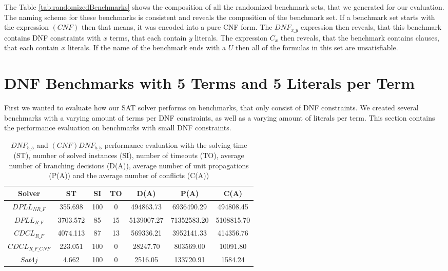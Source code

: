 The Table \ref{tab:randomizedBenchmarks} shows the composition of all the randomized benchmark sets, that we generated for our evaluation. The naming scheme for these benchmarks is consistent and reveals the composition of the benchmark set. If a benchmark set starts with the expression $(CNF)$ then that means, it was encoded into a pure CNF form. The $DNF_{x\_y}$ expression then reveals, that this benchmark contains DNF constraints with $x$ terms, that each contain $y$ literals. The expression $C_x$ then reveals, that the benchmark contains clauses, that each contain $x$ literals. If the name of the benchmark ends with a $U$ then all of the formulas in this set are unsatisfiable.

\section{DNF Benchmarks with 5 Terms and 5 Literals per Term}

First we wanted to evaluate how our SAT solver performs on benchmarks, that only consist of DNF constraints. We created several benchmarks with a varying amount of terms per DNF constraints, as well as a varying amount of literals per term. This section contains the performance evaluation on benchmarks with small DNF constraints.

\begin{table}[!htb]
\centering
\caption[$DNF_{5\_5}$ and $(CNF)DNF_{5\_5}$ performance evaluation]{$DNF_{5\_5}$ and $(CNF)DNF_{5\_5}$ performance evaluation with the solving time (ST), number of solved instances (SI), number of timeouts (TO), average number of branching decisions (D(A)), average number of unit propagations (P(A)) and the average number of conflicts (C(A))}
\label{tab:dnf55Sat}
\begin{tabular}{|c|c|c|c|c|c|c|}
\hline
Solver & ST & SI & TO & D(A) & P(A) & C(A)\\ 
\hline
$DPLL_{NR\_F}$ & 355.698 & 100 & 0 & 494863.73 & 6936490.29 & 494808.45 \\ 
\hline
$DPLL_{R\_F}$ & 3703.572 & 85 & 15 & 5139007.27 & 71352583.20 & 5108815.70 \\ 
\hline
$CDCL_{R\_F}$ & 4074.113 & 87 & 13 & 569336.21 & 3952141.33 & 414356.76 \\ 
\hline
$CDCL_{R\_F\_CNF}$ & 223.051 & 100 & 0 & 28247.70 & 803569.00 & 10091.80 \\ 
\hline
$Sat4j$ & 4.662 & 100 & 0 & 2516.05 & 133720.91 & 1584.24 \\ 
\hline
\end{tabular}
\end{table}

